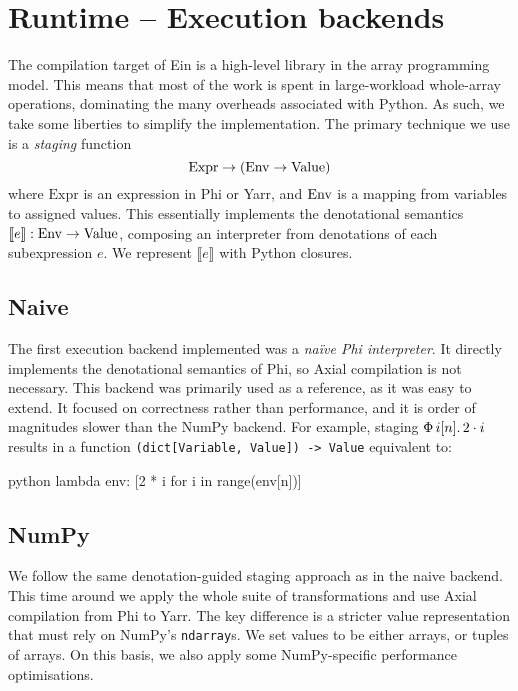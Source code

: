 
\needspace{10em}
\section{Runtime -- Execution backends}
\label{execution-backend}

The compilation target of Ein is a high-level library in the array programming model. This means that most of the work is spent in large-workload whole-array operations, dominating the many overheads associated with Python. As such, we take some liberties to simplify the implementation. The primary technique we use is a \textit{staging} function
$$ \mathrm{Expr} \to \left( \denotenv \to \denotvalue \right) $$
where $\mathrm{Expr}$ is an expression in Phi or Yarr, and $\mathrm{Env}$ is a mapping from variables to assigned values. This essentially implements the denotational semantics $\llbracket e \rrbracket : \mathrm{Env} \to \mathrm{Value}$, composing an interpreter from denotations of each subexpression $e$. We represent $\llbracket e \rrbracket$ with Python closures.

\subsection{Naive}

The first execution backend implemented was a \textit{na\"ive Phi interpreter}. It directly implements the denotational semantics of Phi, so Axial compilation is not necessary. 
This backend was primarily used as a reference, as it was easy to extend. It focused on correctness rather than performance, and it is order of magnitudes slower than the NumPy backend. For example, staging $\Phi\, {i}[{n}] \ldotp {2 \cdot i}$ results in a function \texttt{(dict[Variable, Value]) -> Value} equivalent to:
\begin{center}
\begin{cminted}{python}
lambda env: [2 * i for i in range(env[n])]
\end{cminted}
\end{center}

\subsection{NumPy}

We follow the same denotation-guided staging approach as in the naive backend. This time around we apply the whole suite of transformations and use Axial compilation from Phi to Yarr. The key difference is a stricter value representation that must rely on NumPy's \texttt{ndarray}s. We set values to be either arrays, or tuples of arrays. On this basis, we also apply some NumPy-specific performance optimisations.

